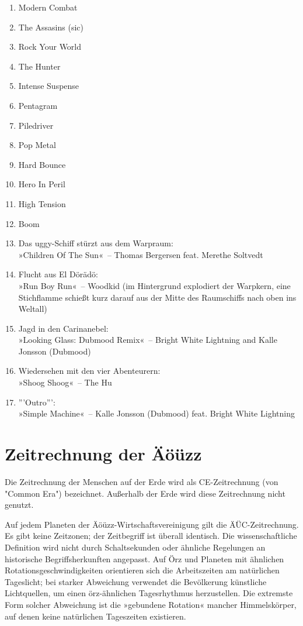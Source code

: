 \begin{enumerate}
    \item Modern Combat
    \item The Assasins (sic)
    \item Rock Your World
    \item The Hunter
    \item Intense Suspense
    \item Pentagram
    \item Piledriver
    \item Pop Metal
    \item Hard Bounce
    \item Hero In Peril
    \item High Tension
    \item Boom
    \item Das uggy-Schiff stürzt aus dem Warpraum:\\ »Children Of The Sun«~– Thomas Bergersen feat. Merethe Soltvedt
    \item Flucht aus El Dörädö:\\ »Run Boy Run«~– Woodkid                                      (im Hintergrund explodiert der Warpkern, eine Stichflamme schießt kurz darauf aus der Mitte des Raumschiffs nach oben ins Weltall)
    \item Jagd in den Carinanebel:\\ »Looking Glass: Dubmood Remix«~– Bright White Lightning and Kalle Jonsson (Dubmood)
    \item Wiedersehen mit den vier Abenteurern:\\ »Shoog Shoog«~– The Hu
    \item '''Outro''':\\ »Simple Machine«~– Kalle Jonsson (Dubmood) feat. Bright White Lightning
\end{enumerate}

\chapter{Zeitrechnung der Äöüzz}

Die Zeitrechnung der Menschen auf der Erde wird als CE-Zeitrechnung (von "Common Era") bezeichnet. Außerhalb der Erde wird diese Zeitrechnung nicht genutzt.

Auf jedem Planeten der Äöüzz-Wirtschaftsvereinigung gilt die ÄÜC-Zeitrechnung. Es gibt keine Zeitzonen; der Zeitbegriff ist überall identisch. Die wissenschaftliche Definition wird nicht durch Schaltsekunden oder ähnliche Regelungen an historische Begriffsherkunften angepasst. Auf Örz und Planeten mit ähnlichen Rotationsgeschwindigkeiten orientieren sich die Arbeitszeiten am natürlichen Tageslicht; bei starker Abweichung verwendet die Bevölkerung künstliche Lichtquellen, um einen örz-ähnlichen Tagesrhythmus herzustellen. Die extremste Form solcher Abweichung ist die »gebundene Rotation« mancher Himmelskörper, auf denen keine natürlichen Tageszeiten existieren.

